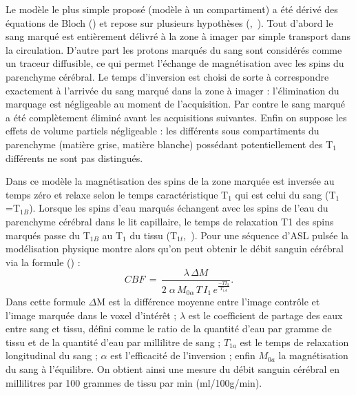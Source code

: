 Le modèle le plus simple proposé (modèle à un compartiment) a été dérivé des équations de Bloch (\cite{Bloch1946}) et repose sur plusieurs hypothèses (\cite{Petersen2006},~\cite{Parkes2005}). Tout d’abord le sang marqué est entièrement délivré à la zone à imager par simple transport dans la circulation. D’autre part les protons marqués du sang sont considérés comme un traceur diffusible, ce qui permet l’échange de magnétisation avec les spins du parenchyme cérébral. Le temps d’inversion est choisi de sorte à correspondre exactement à l’arrivée du sang marqué dans la zone à imager : l’élimination du marquage est négligeable au moment de l’acquisition. Par contre le sang marqué a été complètement éliminé avant les acquisitions suivantes. Enfin on suppose les effets de volume partiels négligeable : les différents sous compartiments du parenchyme (matière grise, matière blanche) possédant potentiellement des T$_1$ différents ne sont pas distingués.

Dans ce modèle la magnétisation des spins de la zone marquée est inversée au temps zéro et relaxe selon le temps caractéristique T$_1$ qui est celui du sang (T$_1$=T$_{1B}$). Lorsque les spins d’eau marqués échangent avec les spins de l’eau du parenchyme cérébral dans le lit capillaire, le temps de relaxation T1 des spins marqués passe du T$_{1B}$ au T$_1$ du tissu (T$_{1t}$,~\cite{Luh1999}). Pour une séquence d’ASL pulsée la modélisation physique montre alors qu’on peut obtenir le débit sanguin cérébral via la formule (\cite{Wang2003}) :
\begin{equation}
\label{eq:debit}
CBF\,=\,\frac{\lambda\,\Delta M}{2\;\alpha\,M_{0\alpha}\,T\,I_1\,e^\frac{-T I_2}{T_{1A}}}.
\end{equation}
Dans cette formule $\Delta$M est la différence moyenne entre l’image contrôle et l’image marquée
dans le voxel d’intérêt ; $\lambda$ est le coefficient de partage des eaux entre sang et tissu, défini comme le
ratio de la quantité d’eau par gramme de tissu et de la quantité d’eau par millilitre de sang ; $T_{1a}$ est le
temps de relaxation longitudinal du sang ; $\alpha$ est l’efficacité de l’inversion ; enfin $M_{0a}$ la magnétisation
du sang à l’équilibre. On obtient ainsi une mesure du débit sanguin cérébral en millilitres par 100
grammes de tissu par min (ml/100g/min).

